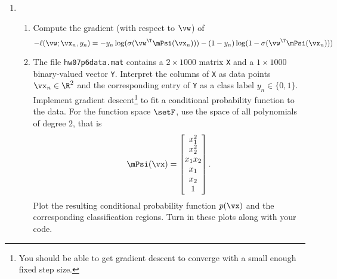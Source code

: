 \documentclass[11pt]{article}
\begin{document}
\begin{enumerate}
\vspace{4mm} 
\item 
\begin{enumerate}
	\item Compute the gradient (with respect to $\vw$) of
	\[
		-\ell(\vw;\vx_n,y_n) = 
		-y_n\log(\sigma(\vw^\T\mPsi(\vx_n))) - (1-y_n)\log(1-\sigma(\vw^\T\mPsi(\vx_n))) 
	\]

	\item The file \texttt{hw07p6data.mat} contains a $2\times 1000$ matrix \texttt{X} and a $1\times 1000$ binary-valued vector \texttt{Y}.  Interpret the columns of \texttt{X} as data points $\vx_n\in\R^2$ and the corresponding entry of \texttt{Y} as a class label $y_n\in\{0,1\}$.  Implement gradient descent\footnote{You should be able to get gradient descent to converge with a small enough fixed step size.} to fit a conditional probability function to the data.  For the function space $\setF$, use the space of all polynomials of degree 2, that is
	\[
		\mPsi(\vx) = 
		\begin{bmatrix}
			x_1^2 \\ x_2^2 \\ x_1x_2 \\ x_1 \\ x_2 \\ 1	
		\end{bmatrix}.
	\]
	Plot the resulting conditional probability function $p(\vx)$ and the corresponding classification regions.  Turn in these plots along with your code.
\end{enumerate}

\end{enumerate}
\end{document}
